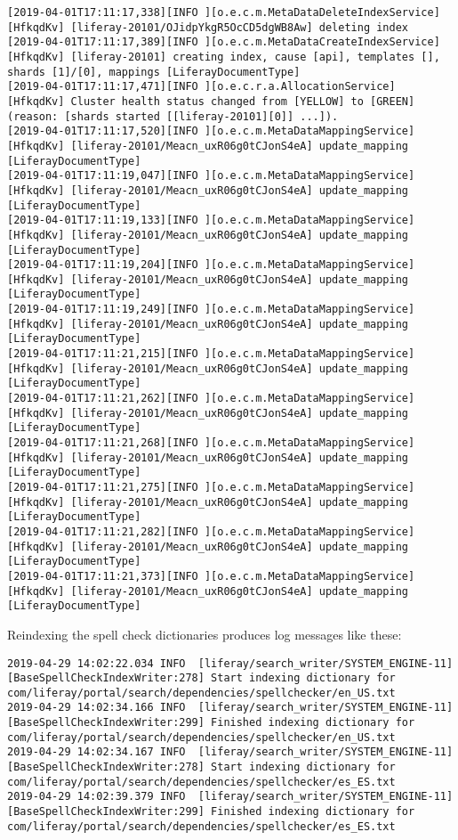\begin{verbatim}
[2019-04-01T17:11:17,338][INFO ][o.e.c.m.MetaDataDeleteIndexService] [HfkqdKv] [liferay-20101/OJidpYkgR5OcCD5dgWB8Aw] deleting index
[2019-04-01T17:11:17,389][INFO ][o.e.c.m.MetaDataCreateIndexService] [HfkqdKv] [liferay-20101] creating index, cause [api], templates [], shards [1]/[0], mappings [LiferayDocumentType]
[2019-04-01T17:11:17,471][INFO ][o.e.c.r.a.AllocationService] [HfkqdKv] Cluster health status changed from [YELLOW] to [GREEN] (reason: [shards started [[liferay-20101][0]] ...]).
[2019-04-01T17:11:17,520][INFO ][o.e.c.m.MetaDataMappingService] [HfkqdKv] [liferay-20101/Meacn_uxR06g0tCJonS4eA] update_mapping [LiferayDocumentType]
[2019-04-01T17:11:19,047][INFO ][o.e.c.m.MetaDataMappingService] [HfkqdKv] [liferay-20101/Meacn_uxR06g0tCJonS4eA] update_mapping [LiferayDocumentType]
[2019-04-01T17:11:19,133][INFO ][o.e.c.m.MetaDataMappingService] [HfkqdKv] [liferay-20101/Meacn_uxR06g0tCJonS4eA] update_mapping [LiferayDocumentType]
[2019-04-01T17:11:19,204][INFO ][o.e.c.m.MetaDataMappingService] [HfkqdKv] [liferay-20101/Meacn_uxR06g0tCJonS4eA] update_mapping [LiferayDocumentType]
[2019-04-01T17:11:19,249][INFO ][o.e.c.m.MetaDataMappingService] [HfkqdKv] [liferay-20101/Meacn_uxR06g0tCJonS4eA] update_mapping [LiferayDocumentType]
[2019-04-01T17:11:21,215][INFO ][o.e.c.m.MetaDataMappingService] [HfkqdKv] [liferay-20101/Meacn_uxR06g0tCJonS4eA] update_mapping [LiferayDocumentType]
[2019-04-01T17:11:21,262][INFO ][o.e.c.m.MetaDataMappingService] [HfkqdKv] [liferay-20101/Meacn_uxR06g0tCJonS4eA] update_mapping [LiferayDocumentType]
[2019-04-01T17:11:21,268][INFO ][o.e.c.m.MetaDataMappingService] [HfkqdKv] [liferay-20101/Meacn_uxR06g0tCJonS4eA] update_mapping [LiferayDocumentType]
[2019-04-01T17:11:21,275][INFO ][o.e.c.m.MetaDataMappingService] [HfkqdKv] [liferay-20101/Meacn_uxR06g0tCJonS4eA] update_mapping [LiferayDocumentType]
[2019-04-01T17:11:21,282][INFO ][o.e.c.m.MetaDataMappingService] [HfkqdKv] [liferay-20101/Meacn_uxR06g0tCJonS4eA] update_mapping [LiferayDocumentType]
[2019-04-01T17:11:21,373][INFO ][o.e.c.m.MetaDataMappingService] [HfkqdKv] [liferay-20101/Meacn_uxR06g0tCJonS4eA] update_mapping [LiferayDocumentType]
\end{verbatim}

Reindexing the spell check dictionaries produces log messages like
these:

\begin{verbatim}
2019-04-29 14:02:22.034 INFO  [liferay/search_writer/SYSTEM_ENGINE-11][BaseSpellCheckIndexWriter:278] Start indexing dictionary for com/liferay/portal/search/dependencies/spellchecker/en_US.txt
2019-04-29 14:02:34.166 INFO  [liferay/search_writer/SYSTEM_ENGINE-11][BaseSpellCheckIndexWriter:299] Finished indexing dictionary for com/liferay/portal/search/dependencies/spellchecker/en_US.txt
2019-04-29 14:02:34.167 INFO  [liferay/search_writer/SYSTEM_ENGINE-11][BaseSpellCheckIndexWriter:278] Start indexing dictionary for com/liferay/portal/search/dependencies/spellchecker/es_ES.txt
2019-04-29 14:02:39.379 INFO  [liferay/search_writer/SYSTEM_ENGINE-11][BaseSpellCheckIndexWriter:299] Finished indexing dictionary for com/liferay/portal/search/dependencies/spellchecker/es_ES.txt
\end{verbatim}

